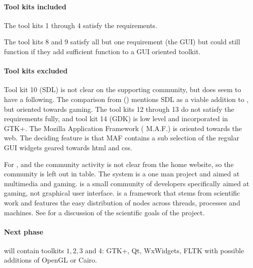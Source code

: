 \paragraph{Tool kits included} The tool kits 1 through 4 satisfy the
requirements.  

The tool kits 8 and 9 satisfy all but one requirement (the GUI) but could still
function if they add sufficient function to a GUI oriented toolkit. 

\paragraph{Tool kits excluded} Tool kit 10 ({\sf SDL}) is not clear on the
supporting community, but does seem to have a following.  The comparison from
 (\cite{wxwidget:comparison}) mentions {\sf SDL} as a viable
addition to , but oriented towards gaming. The tool kits 12
through 13 do not satisfy the requirements fully, and tool kit 14 (GDK) is low
level and incorporated in {\sf GTK+}.  The Mozilla Application Framework ({\sf
M.A.F.}) is oriented towards the web. The deciding feature is that {\sf MAF}
contains a sub selection of the regular GUI widgets geared towards html and
css.

For ,  and  the community activity is not clear from
the home website, so the community is left out in table. The system  is
a one man project and aimed at multimedia and gaming.   is a small
community of developers specifically aimed at gaming, not graphical user
interface.   is a framework that stems from scientific work and
features the easy distribution of nodes across threads, processes and machines.
See \cite{greed:gled} for a discussion of the scientific goals of the 
project.

\paragraph{Next phase} will contain toolkits $1, 2, 3$ and 4: {\sf GTK+, Qt,
WxWidgets, FLTK} with possible additions of OpenGL or Cairo. 

